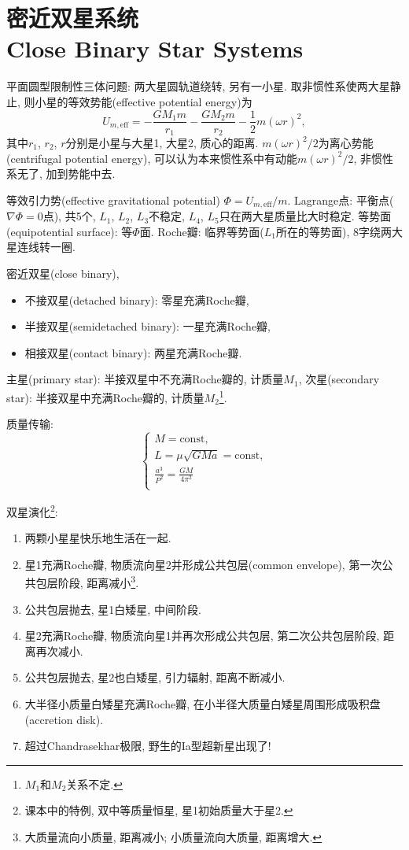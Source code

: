 \chapter{密近双星系统\\Close Binary Star Systems}

平面圆型限制性三体问题: 两大星圆轨道绕转, 另有一小星. 取非惯性系使两大星静止, 则小星的等效势能(effective potential energy)为
\begin{equation*}
    U_{m,\text{eff}}=-\frac{GM_1m}{r_1}-\frac{GM_2m}{r_2}-\frac{1}{2}m(\omega r)^2,
\end{equation*}
其中$r_1$, $r_2$, $r$分别是小星与大星1, 大星2, 质心的距离. $m(\omega r)^2/2$为离心势能(centrifugal potential energy), 可以认为本来惯性系中有动能$m(\omega r)^2/2$, 非惯性系无了, 加到势能中去.

等效引力势(effective gravitational potential) $\Phi=U_{m,\text{eff}}/m$. Lagrange点: 平衡点($\nabla\Phi=0$点), 共5个, $L_1$, $L_2$, $L_3$不稳定, $L_4$, $L_5$只在两大星质量比大时稳定. 等势面(equipotential surface): 等$\Phi$面. Roche瓣: 临界等势面($L_1$所在的等势面), 8字绕两大星连线转一圈.

密近双星(close binary),
\begin{itemize}
    \item 不接双星(detached binary): 零星充满Roche瓣,
    \item 半接双星(semidetached binary): 一星充满Roche瓣,
    \item 相接双星(contact binary): 两星充满Roche瓣.
\end{itemize}

主星(primary star): 半接双星中不充满Roche瓣的, 计质量$M_1$, 次星(secondary star): 半接双星中充满Roche瓣的, 计质量$M_2$\footnote{$M_1$和$M_2$关系不定.}.

质量传输:
\begin{equation*}
    \begin{cases}
        M=\text{const},\\
        L=\mu\sqrt{GMa}=\text{const},\\
        \frac{a^3}{P^2}=\frac{GM}{4\pi^2}\\
    \end{cases}
\end{equation*}

双星演化\footnote{课本中的特例, 双中等质量恒星, 星1初始质量大于星2.}:
\begin{enumerate}
    \item 两颗小星星快乐地生活在一起.
    \item 星1充满Roche瓣, 物质流向星2并形成公共包层(common envelope), 第一次公共包层阶段, 距离减小\footnote{大质量流向小质量, 距离减小; 小质量流向大质量, 距离增大.}.
    \item 公共包层抛去, 星1白矮星, 中间阶段.
    \item 星2充满Roche瓣, 物质流向星1并再次形成公共包层, 第二次公共包层阶段, 距离再次减小.
    \item 公共包层抛去, 星2也白矮星, 引力辐射, 距离不断减小.
    \item 大半径小质量白矮星充满Roche瓣, 在小半径大质量白矮星周围形成吸积盘(accretion disk).
    \item 超过Chandrasekhar极限, 野生的Ia型超新星出现了!
\end{enumerate}

